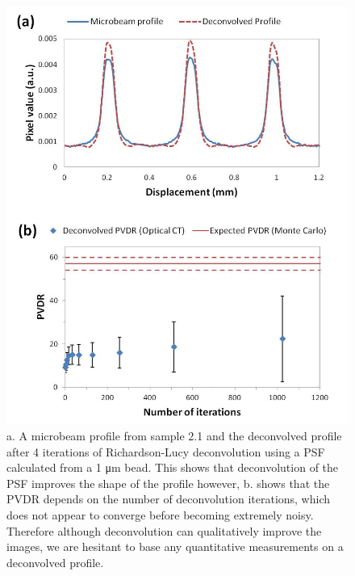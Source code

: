 	\begin{figure}
		\centering
		\includegraphics[width=0.85\linewidth]{mrt_img/mrt_Fig8}
		\caption{a. A microbeam profile from sample 2.1 and the deconvolved profile after 4 iterations of Richardson-Lucy deconvolution using a PSF calculated from a 1 \si{\um} bead. This shows that deconvolution of the PSF improves the shape of the profile however, b. shows that the PVDR depends on the number of deconvolution iterations, which does not appear to converge before becoming extremely noisy. Therefore although deconvolution can qualitatively improve the images, we are hesitant to base any quantitative measurements on a deconvolved profile.}
		\label{fig:Fig8}
	\end{figure}
	
	
